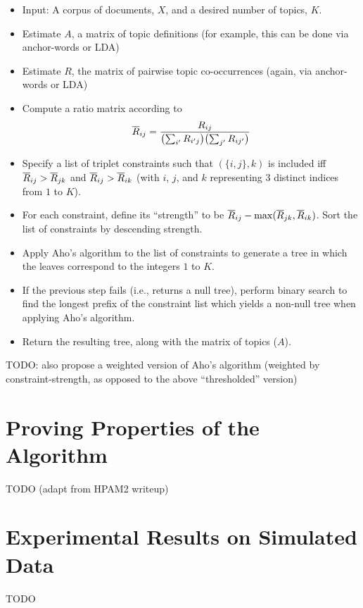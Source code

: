 \documentclass{article}
\theoremstyle{definition}
\begin{document}
\begin{itemize}
  \item Input: A corpus of documents, $X$, and a desired number of topics, $K$.
  \item Estimate $A$, a matrix of topic definitions (for example, this can be done via anchor-words or LDA)
  \item Estimate $R$, the matrix of pairwise topic co-occurrences (again, via anchor-words or LDA)
  \item Compute a ratio matrix according to
  \begin{align}
  \overline{R}_{ij} = \frac{R_{ij}}{ \bigl( \sum_{i'} R_{i'j} \bigr) \bigl( \sum_{j'} R_{ij'} \bigr) }
  \end{align}
  \item Specify a list of triplet constraints such that $(\{i, j\}, k)$ is included iff $\overline{R}_{ij} > \overline{R}_{jk}$ and $\overline{R}_{ij} > \overline{R}_{ik}$ (with $i$, $j$, and $k$ representing 3 distinct indices from $1$ to $K$).
  \item For each constraint, define its ``strength'' to be $\overline{R}_{ij} - \max(\overline{R}_{jk}, \overline{R}_{ik})$.
        Sort the list of constraints by descending strength.
  \item Apply Aho's algorithm to the list of constraints to generate a tree in which the leaves correspond to the integers $1$ to $K$.
  \item If the previous step fails (i.e., returns a null tree), perform binary search to find the longest prefix of the constraint list which yields a non-null tree when applying Aho's algorithm.
  \item Return the resulting tree, along with the matrix of topics ($A$).
\end{itemize}

TODO: also propose a weighted version of Aho's algorithm (weighted by constraint-strength, as opposed to the above ``thresholded'' version)

\section{Proving Properties of the Algorithm}

TODO (adapt from HPAM2 writeup)

\section{Experimental Results on Simulated Data}

TODO
\end{document}

